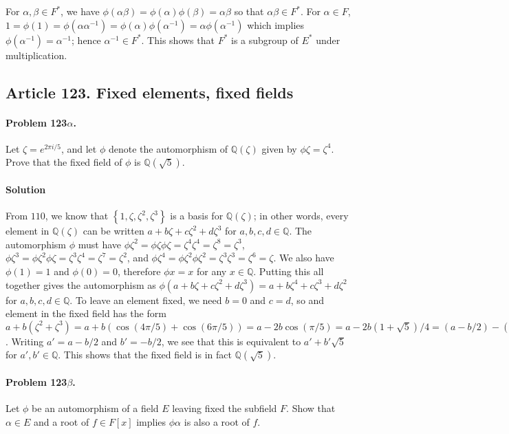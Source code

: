 For $\alpha, \beta \in F^*$, we have
$\phi (\alpha \beta) = \phi(\alpha) \phi(\beta) = \alpha \beta$ so that
$\alpha \beta \in F^*$. For $\alpha \in F$, $1 = \phi(1) = \phi (\alpha \alpha^{-1}) =
\phi(\alpha) \phi(\alpha^{-1}) = \alpha \phi(\alpha^{-1})$ which implies
$\phi(\alpha^{-1}) = \alpha^{-1}$; hence $\alpha^{-1} \in F^*$. This shows that $F^*$ is a
subgroup of $E^*$ under multiplication.

\subsection{Article 123. Fixed elements, fixed fields}

\paragraph{Problem 123$\alpha$.}
Let $\zeta = e^{2\pi i/5}$, and let $\phi$ denote the automorphism of
$\mathbb{Q}(\zeta)$ given by $\phi \zeta = \zeta^4$. Prove that the fixed
field of $\phi$ is $\mathbb{Q}(\sqrt{5})$.

\paragraph*{Solution}
From $110$, we know that $\left\{1, \zeta, \zeta^2, \zeta^3 \right\}$
is a basis for $\mathbb{Q}(\zeta)$; in other words, every element in $\mathbb{Q}(\zeta)$
can be written $a + b\zeta + c\zeta^2 + d\zeta^3$ for $a, b,c,d \in \mathbb{Q}$.
The automorphism $\phi$ must have $\phi\zeta^2 = \phi\zeta \phi\zeta = \zeta^4 \zeta^4
= \zeta^8 = \zeta^3$, $\phi\zeta^3 = \phi\zeta^2 \phi\zeta = \zeta^3 \zeta^4
= \zeta^7 = \zeta^2$, and $\phi\zeta^4 = \phi\zeta^2 \phi\zeta^2 = \zeta^3 \zeta^3
= \zeta^6 = \zeta$. We also have $\phi(1) = 1$ and $\phi(0) = 0$, therefore
$\phi x = x$ for any $x \in \mathbb{Q}$. Putting this all together gives the
automorphism as $\phi(a+b\zeta+c\zeta^2+d\zeta^3)=a+b\zeta^4+c\zeta^3+d\zeta^2$
for $a,b,c,d \in \mathbb{Q}$. To leave an element fixed, we need $b=0$ and $c=d$,
so and element in the fixed field has the form $a + b(\zeta^2 +\zeta^3) =
a + b(\cos(4\pi/5)+\cos(6\pi/5)) = a - 2b\cos(\pi/5) = a - 2b(1+\sqrt{5})/4 =
(a-b/2) - (b\sqrt{5}/2)$. Writing $a' = a - b/2$ and $b' = -b/2$, we see that this
is equivalent to $a' + b'\sqrt{5}$ for $a',b' \in \mathbb{Q}$. This shows that
the fixed field is in fact $\mathbb{Q}(\sqrt{5})$.

\paragraph{Problem 123$\beta$.}
Let $\phi$ be an automorphism of a field $E$ leaving fixed the subfield $F$.
Show that $\alpha \in E$ and a root of $f \in F[x]$ implies $\phi\alpha$ is also
a root of $f$.

